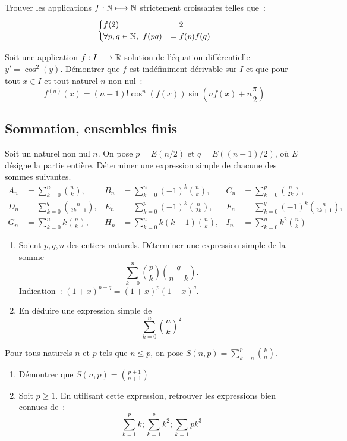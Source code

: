\begin{exercice}
    Trouver les applications \(f : \mathbb{N} \longmapsto \mathbb{N}\) strictement croissantes telles que~:
    \[\begin{cases} f(2) &= 2 \\\forall p, q \in \mathbb{N}, \ f(pq) &= f(p)f(q) \end{cases}\]
\end{exercice}
\begin{exercice}
    Soit une application \(f : I \longmapsto \mathbb{R}\) solution de l'équation différentielle \(y' = \cos^2(y)\). Démontrer que \(f\) est indéfiniment dérivable sur \(I\) et que pour tout \(x \in I\) et tout naturel \(n\) non nul~: \[f^{(n)}(x) = (n-1)! \cos^n(f(x)) \sin\left(nf(x) + n\frac{\pi}{2}\right)\]
\end{exercice}
\subsection{Sommation, ensembles finis}
\begin{exercice}
    Soit un naturel non nul \(n\). On pose \(p = E(n/2)\) et \(q = E((n-1)/2)\), où \(E\) désigne la partie entière. Déterminer une expression simple de chacune des sommes suivantes.
    \begin{align*}
        A_n &= \sum_{k=0}^n \binom{n}{k}, & B_n&=\sum_{k=0}^n (-1)^k\binom{n}{k}, & C_n&=\sum_{k=0}^p \binom{n}{2k}, \\
        D_n &= \sum_{k=0}^q \binom{n}{2k+1}, & E_n&=\sum_{k=0}^p (-1)^k\binom{n}{2k}, & F_n&=\sum_{k=0}^q (-1)^k\binom{n}{2k+1}, \\
        G_n &= \sum_{k=0}^n k\binom{n}{k}, & H_n&=\sum_{k=0}^n k(k-1)\binom{n}{k}, & I_n&=\sum_{k=0}^n k^2\binom{n}{k}
    \end{align*}
\end{exercice}
\begin{exercice}
    \begin{enumerate}
        \item Soient \(p, q, n\) des entiers naturels. Déterminer une expression simple de la somme \[\sum_{k=0}^n \binom{p}{k}\binom{q}{n-k}.\] Indication~: \((1+x)^{p+q} = (1+x)^p (1+x)^q\).
        \item En déduire une expression simple de \[\sum_{k=0}^n \binom{n}{k}^2\]
    \end{enumerate}
\end{exercice}
\begin{exercice}
    Pour tous naturels \(n\) et \(p\) tels que \(n \leqslant p\), on pose \(S(n,p) = \sum_{k=n}^p \binom{k}{n}\).
    \begin{enumerate}
        \item Démontrer que \(S(n,p) = \binom{p+1}{n+1}\)
        \item Soit \(p \geqslant 1\). En utilisant cette expression, retrouver les expressions bien connues de~:\[\sum_{k=1}^p k ; \sum_{k=1}^p k^2 ; \sum_{k=1}{p} k^3\]
    \end{enumerate}
\end{exercice}
